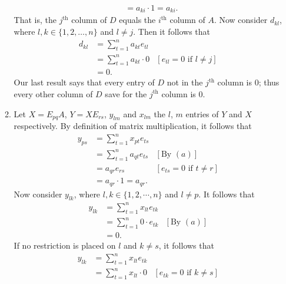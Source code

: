 \documentclass[9pt]{article}
\begin{document}
\begin{enumerate}
\begin{enumerate}
\begin{align*}
                         &= a_{ki} \cdot 1 = a_{ki}.
               \end{align*}
               That is, the $j^{\text{th}}$ column of $D$ equals the
               $i^{\text{th}}$ column of $A$. Now consider $d_{kl}$, where
               $l, k \in \{1, 2, \ldots, n\}$ and $l \neq j$. Then it follows
               that
               \begin{align*}
                  d_{kl} &= \sum_{t=1}^na_{kt}e_{tl} \\
                         &= \sum_{t=1}^na_{kt} \cdot 0 &[e_{tl} = 0
                            \text{ if } l \neq j] \\
                         &= 0.
               \end{align*}
               Our last result says that every entry of $D$ not in the
               $j^{\text{th}}$ column is 0; thus every other column of $D$ save 
               for the $j^{\text{th}}$ column is 0.
         \item Let $X = E_{pq}A$, $Y = XE_{rs}$, $y_{lm}$ and $x_{lm}$ the $l$, 
               $m$ entries of $Y$ and $X$ respectively. By definition of 
               matrix multiplication, it follows that
               \begin{align*}
                  y_{ps} &= \sum_{t=1}^nx_{pt}e_{ts} \\
                     &= \sum_{t=1}^na_{qt}e_{ts} &[\text{By }(a)] \\
                     &= a_{qr}e_{rs} &[e_{ts} = 0 \text{ if } t \neq r] \\
                     &= a_{qr} \cdot 1 = a_{qr}. 
               \end{align*}
               Now consider $y_{lk}$, where $l, k \in \{1, 2, \cdots, n\}$ and
               $l \neq p$. It follows that
               \begin{align*}
                  y_{lk} &= \sum_{t=1}^nx_{lt}e_{tk} \\
                     &= \sum_{t=1}^n0 \cdot e_{tk} &[\text{By }(a)] \\
                     &= 0.
               \end{align*}
               If no restriction is placed on $l$ and $k \neq s$, it follows
               that
               \begin{align*}
                  y_{lk} &= \sum_{t=1}^nx_{lt}e_{tk} \\
                     &= \sum_{t=1}^nx_{lt} \cdot 0 &[e_{tk} = 0 \text{ if }
                        k \neq s] \\

\end{align*}
\end{enumerate}
\end{enumerate}
\end{document}
